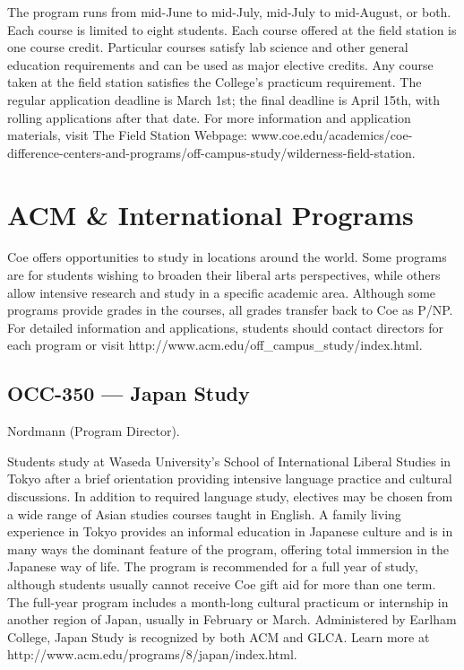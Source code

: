 \documentclass[
  letterpaper,
]{scrbook}
\begin{document}
The program runs from mid-June to mid-July, mid-July to mid-August, or
both. Each course is limited to eight students. Each course offered at
the field station is one course credit. Particular courses satisfy lab
science and other general education requirements and can be used as
major elective credits. Any course taken at the field station satisfies
the College's practicum requirement. The regular application deadline is
March 1st; the final deadline is April 15th, with rolling applications
after that date. For more information and application materials, visit
The Field Station Webpage:
www.coe.edu/academics/coe-difference-centers-and-programs/off-campus-study/wilderness-field-station.

\section{ACM \& International
Programs}\label{sec-ACM-and-international-programs}

Coe offers opportunities to study in locations around the world. Some
programs are for students wishing to broaden their liberal arts
perspectives, while others allow intensive research and study in a
specific academic area. Although some programs provide grades in the
courses, all grades transfer back to Coe as P/NP. For detailed
information and applications, students should contact directors for each
program or visit http://www.acm.edu/off\_campus\_study/index.html.

\subsection{OCC-350 --- Japan Study}\label{occ-350-japan-study}

Nordmann (Program Director).

Students study at Waseda University's School of International Liberal
Studies in Tokyo after a brief orientation providing intensive language
practice and cultural discussions. In addition to required language
study, electives may be chosen from a wide range of Asian studies
courses taught in English. A family living experience in Tokyo provides
an informal education in Japanese culture and is in many ways the
dominant feature of the program, offering total immersion in the
Japanese way of life. The program is recommended for a full year of
study, although students usually cannot receive Coe gift aid for more
than one term. The full-year program includes a month-long cultural
practicum or internship in another region of Japan, usually in February
or March. Administered by Earlham College, Japan Study is recognized by
both ACM and GLCA. Learn more at
http://www.acm.edu/programs/8/japan/index.html.
\end{document}
